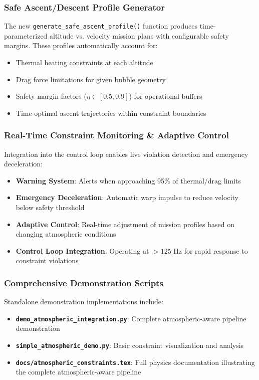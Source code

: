 \documentclass[11pt]{article}
\begin{document}
\subsubsection{Safe Ascent/Descent Profile Generator}
The new \texttt{generate\_safe\_ascent\_profile()} function produces time-parameterized altitude vs. velocity mission plans with configurable safety margins. These profiles automatically account for:
\begin{itemize}
\item Thermal heating constraints at each altitude
\item Drag force limitations for given bubble geometry
\item Safety margin factors ($\eta \in [0.5, 0.9]$) for operational buffers
\item Time-optimal ascent trajectories within constraint boundaries
\end{itemize}

\subsubsection{Real-Time Constraint Monitoring \& Adaptive Control}
Integration into the control loop enables live violation detection and emergency deceleration:
\begin{itemize}
\item \textbf{Warning System}: Alerts when approaching 95\% of thermal/drag limits
\item \textbf{Emergency Deceleration}: Automatic warp impulse to reduce velocity below safety threshold
\item \textbf{Adaptive Control}: Real-time adjustment of mission profiles based on changing atmospheric conditions
\item \textbf{Control Loop Integration}: Operating at $>125$ Hz for rapid response to constraint violations
\end{itemize}

\subsubsection{Comprehensive Demonstration Scripts}
Standalone demonstration implementations include:
\begin{itemize}
\item \textbf{\texttt{demo\_atmospheric\_integration.py}}: Complete atmospheric-aware pipeline demonstration
\item \textbf{\texttt{simple\_atmospheric\_demo.py}}: Basic constraint visualization and analysis
\item \textbf{\texttt{docs/atmospheric\_constraints.tex}}: Full physics documentation illustrating the complete atmospheric-aware pipeline
\end{itemize}
\end{document}
